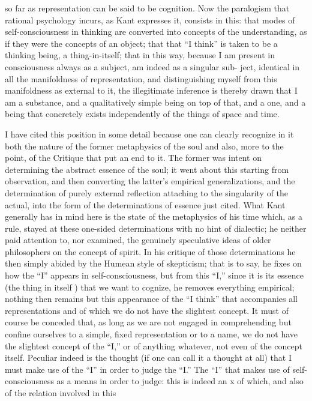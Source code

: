 so far as representation can be said to be cognition.
 Now the paralogism
that rational psychology incurs, as Kant expresses it, consists in this: that
modes of self-consciousness in thinking are converted into concepts of the
understanding, as if they were the concepts of an object; that that “I think”
is taken to be a thinking being, a thing-in-itself; that in this way, because I
am present in consciousness always as a subject, am indeed as a singular sub-
ject, identical in all the manifoldness of representation, and distinguishing
myself from this manifoldness as external to it, the illegitimate inference
is thereby drawn that I am a substance, and a qualitatively simple being on
top of that, and a one, and a being that concretely exists independently of the
things of space and time.

I have cited this position in some detail because one can clearly recognize
in it both the nature of the former metaphysics of the soul and also, more to
the point, of the Critique that put an end to it.
 The former was intent on
determining the abstract essence of the soul; it went about this starting from
observation, and then converting the latter's empirical generalizations, and
the determination of purely external reflection attaching to the singularity
of the actual, into the form of the determinations of essence just cited.
What Kant generally has in mind here is the state of the metaphysics of
his time which, as a rule, stayed at these one-sided determinations with no
hint of dialectic; he neither paid attention to, nor examined, the genuinely
speculative ideas of older philosophers on the concept of spirit. In his
critique of those determinations he then simply abided by the Humean
style of skepticism; that is to say, he fixes on how the “I” appears in
self-consciousness, but from this “I,” since it is its essence (the thing in
itself ) that we want to cognize, he removes everything empirical; nothing
then remains but this appearance of the “I think” that accompanies all
representations and of which we do not have the slightest concept.
 It must
of course be conceded that, as long as we are not engaged in comprehending
but confine ourselves to a simple, fixed representation or to a name, we
do not have the slightest concept of the “I,” or of anything whatever, not
even of the concept itself.
 Peculiar indeed is the thought (if one can call
it a thought at all) that I must make use of the “I” in order to judge the
“I.” The “I” that makes use of self-consciousness as a means in order to
judge: this is indeed an x of which, and also of the relation involved in this
